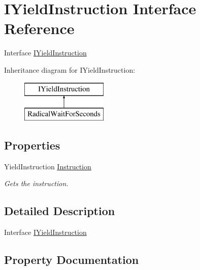 \hypertarget{interface_i_yield_instruction}{}\section{I\+Yield\+Instruction Interface Reference}
\label{interface_i_yield_instruction}


Interface \hyperlink{interface_i_yield_instruction}{I\+Yield\+Instruction}  


Inheritance diagram for I\+Yield\+Instruction\+:\begin{figure}[H]
\begin{center}
\leavevmode
\includegraphics[height=2.000000cm]{interface_i_yield_instruction}
\end{center}
\end{figure}
\subsection*{Properties}
\begin{DoxyCompactItemize}
\item 
Yield\+Instruction \hyperlink{interface_i_yield_instruction_a15d4e90ac68d12f7d6ca04df401dd403}{Instruction}
\begin{DoxyCompactList}\small\item\em Gets the instruction. \end{DoxyCompactList}\end{DoxyCompactItemize}


\subsection{Detailed Description}
Interface \hyperlink{interface_i_yield_instruction}{I\+Yield\+Instruction} 



\subsection{Property Documentation}
\mbox{\label{interface_i_yield_instruction_a15d4e90ac68d12f7d6ca04df401dd403}} 
